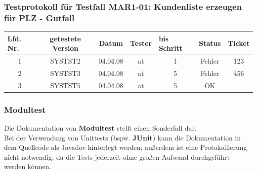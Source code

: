 \subsubsection*{Testprotokoll für Testfall MAR1-01: Kundenliste erzeugen für PLZ - Gutfall}
\begin{table}[]
    \begin{tabular}{|c|c|c|c|c|c|c|}
        \hline
        \multicolumn{1}{|l|}{\textbf{Lfd. Nr.}} & \textbf{getestete Version} & \textbf{Datum} & \multicolumn{1}{l|}{\textbf{Tester}} & \multicolumn{1}{l|}{\textbf{bis Schritt}} & \multicolumn{1}{l|}{\textbf{Status}} & \multicolumn{1}{l|}{\textbf{Ticket}} \\ \hline
        1                                       & SYSTST2                    & 04.04.08       & at                                   & 1                                         & Fehler                               & 123                                  \\ \hline
        2                                       & SYSTST3                    & 04.04.08       & at                                   & 5                                         & Fehler                               & 456                                  \\ \hline
        3                                       & SYSTST5                    & 04.04.08       & at                                   & 5                                         & OK                                   &                                      \\ \hline
    \end{tabular}
\end{table}

\subsubsection*{Modultest}
Die Dokumentation von \textbf{Modultest} stellt einen Sonderfall dar.\\
Bei der Verwendung von Unittests (bspw. \textbf{JUnit}) kann die Dokumentation in dem Quellcode als Javadoc hinterlegt werden; außerdem ist eine Protokollierung nicht notwendig, da die Tests jederzeit ohne großen Aufwand durchgeführt werden können.